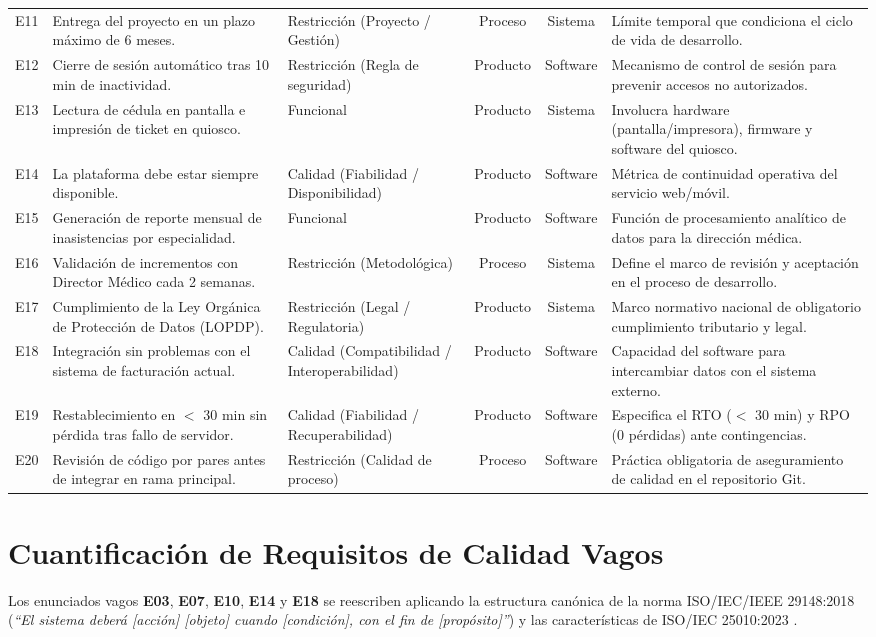\documentclass[conference]{IEEEtran}
\begin{document}
\begin{center}
\begin{tabularx}{\textwidth}{@{}c Y p{3.2cm} c c Y@{}}
			E11 & Entrega del proyecto en un plazo m\'aximo de 6 meses. & Restricci\'on (Proyecto / Gesti\'on) & Proceso & Sistema & L\'imite temporal que condiciona el ciclo de vida de desarrollo.\\
			E12 & Cierre de sesi\'on autom\'atico tras 10 min de inactividad. & Restricci\'on (Regla de seguridad) & Producto & Software & Mecanismo de control de sesi\'on para prevenir accesos no autorizados.\\
			E13 & Lectura de c\'edula en pantalla e impresi\'on de ticket en quiosco. & Funcional & Producto & Sistema & Involucra hardware (pantalla/impresora), firmware y software del quiosco.\\
			E14 & La plataforma debe estar siempre disponible. & Calidad (Fiabilidad / Disponibilidad) & Producto & Software & M\'etrica de continuidad operativa del servicio web/m\'ovil.\\
			E15 & Generaci\'on de reporte mensual de inasistencias por especialidad. & Funcional & Producto & Software & Funci\'on de procesamiento anal\'itico de datos para la direcci\'on m\'edica.\\
			E16 & Validaci\'on de incrementos con Director M\'edico cada 2 semanas. & Restricci\'on (Metodol\'ogica) & Proceso & Sistema & Define el marco de revisi\'on y aceptaci\'on en el proceso de desarrollo.\\
			E17 & Cumplimiento de la Ley Org\'anica de Protecci\'on de Datos (LOPDP). & Restricci\'on (Legal / Regulatoria) & Producto & Sistema & Marco normativo nacional de obligatorio cumplimiento tributario y legal.\\
			E18 & Integraci\'on sin problemas con el sistema de facturaci\'on actual. & Calidad (Compatibilidad / Interoperabilidad) & Producto & Software & Capacidad del software para intercambiar datos con el sistema externo.\\
			E19 & Restablecimiento en $<$ 30 min sin p\'erdida tras fallo de servidor. & Calidad (Fiabilidad / Recuperabilidad) & Producto & Software & Especifica el RTO ($<$ 30 min) y RPO (0 p\'erdidas) ante contingencias.\\
			E20 & Revisi\'on de c\'odigo por pares antes de integrar en rama principal. & Restricci\'on (Calidad de proceso) & Proceso & Software & Pr\'actica obligatoria de aseguramiento de calidad en el repositorio Git.\\
			\bottomrule
		\end{tabularx}
	\end{center}
	
	\section{Cuantificaci\'on de Requisitos de Calidad Vagos}
	Los enunciados vagos \textbf{E03}, \textbf{E07}, \textbf{E10}, \textbf{E14} y \textbf{E18} se reescriben aplicando la estructura can\'onica de la norma ISO/IEC/IEEE 29148:2018 (\emph{``El sistema deber\'a [acci\'on] [objeto] cuando [condici\'on], con el fin de [prop\'osito]''}) y las caracter\'isticas de ISO/IEC 25010:2023 \cite{iso29148, iso25010}.
	
\end{document}
